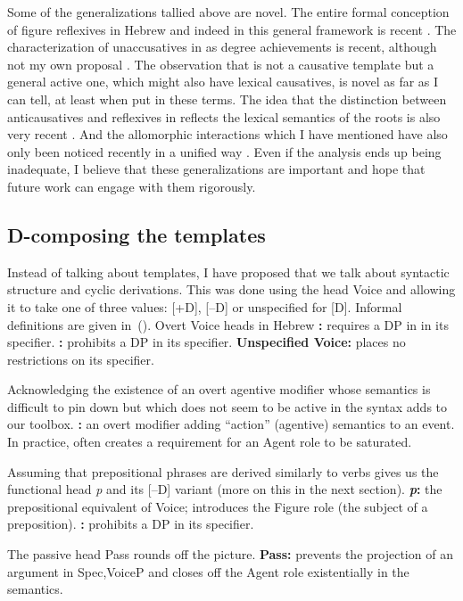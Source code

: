 Some of the generalizations tallied above are novel. The entire formal conception of figure reflexives in Hebrew \citep{kastner16phd} and indeed in this general framework is recent \citep{wood12phd,wood14nllt}. The characterization of unaccusatives in {\thif} as degree achievements is recent, although not my own proposal \cite{lev16}. The observation that {\thif} is not a causative template but a general active one, which might also have lexical causatives, is novel as far as I can tell, at least when put in these terms. The idea that the distinction between anticausatives and reflexives in {\thit} reflects the lexical semantics of the roots is also very recent \cite{kastner17gjgl}. And the allomorphic interactions which I have mentioned have also only been noticed recently in a unified way \cite{kastner18nllt}. Even if the analysis ends up being inadequate, I believe that these generalizations are important and hope that future work can engage with them rigorously.

	\subsection{D-composing the templates}
Instead of talking about templates, I have proposed that we talk about syntactic structure and cyclic derivations. This was done using the head Voice and allowing it to take one of three values: [+D], [--D] or unspecified for [D]. Informal definitions are given in~(\nextx).
\pex Overt Voice heads in Hebrew
\a \textbf{{\vd}:} requires a DP in in its specifier.
\a \textbf{{\vz}:} prohibits a DP in its specifier.
\a \textbf{Unspecified Voice:} places no restrictions on its specifier.
\xe

Acknowledging the existence of an overt agentive modifier whose semantics is difficult to pin down but which does not seem to be active in the syntax adds {\va} to our toolbox.
\ex \textbf{{\va}:} an overt modifier adding ``action'' (agentive) semantics to an event. In practice, often creates a requirement for an Agent role to be saturated.
\xe

Assuming that prepositional phrases are derived similarly to verbs gives us the functional head \textit{p} and its [--D] variant {\pz} (more on this in the next section).
\pex
	\a \textbf{\textit{p}:} the prepositional equivalent of Voice; introduces the Figure role (the subject of a preposition).
	\a \textbf{{\pz}:} prohibits a DP in its specifier.
\xe

The passive head Pass rounds off the picture.
\ex \textbf{Pass:} prevents the projection of an argument in Spec,VoiceP and closes off the Agent role existentially in the semantics.
\xe

